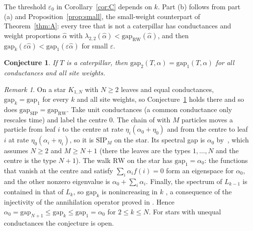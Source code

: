 \documentclass[11pt]{article}
\newtheorem{conjecture}[theorem]{Conjecture}
\theoremstyle{remark}
\newtheorem{remark}[theorem]{Remark}
\newcommand{\gap}{\mathrm{gap}}
\newcommand{\RW}{\mathrm{RW}}
\newcommand{\eps}{\varepsilon}
\begin{document}
The threshold $\eps_0$ in Corollary~\ref{cor:C} depends on $k$. Part (b) follows from part (a) and Proposition~\ref{prop:small}, the small-weight counterpart of Theorem~\ref{thm:A}: every tree that is not a caterpillar has conductances and weight proportions $\hat\alpha$ with $\lambda_{2,2}(\hat\alpha)<\gap_{\RW}(\hat\alpha)$, and then $\gap_k(\eps\hat\alpha)<\gap_1(\eps\hat\alpha)$ for small $\eps$.

\begin{conjecture}\label{conj}
If $T$ is a caterpillar, then $\gap_2(T,\alpha)=\gap_1(T,\alpha)$ for all conductances and all site weights.
\end{conjecture}

\begin{remark}\label{rem:star}
On a star $K_{1,N}$ with $N\ge2$ leaves and equal conductances, $\gap_k=\gap_1$ for every $k$ and all site weights, so Conjecture~\ref{conj} holds there and so does $\gap_{\mathrm{SIP}}=\gap_{\RW}$. Take unit conductances (a common conductance only rescales time) and label the centre $0$. The chain of \cite[Section~5]{FMW15} with $M$ particles moves a particle from leaf $i$ to the centre at rate $\eta_i(\alpha_0+\eta_0)$ and from the centre to leaf $i$ at rate $\eta_0(\alpha_i+\eta_i)$, so it is $\mathrm{SIP}_M$ on the star. Its spectral gap is $\alpha_0$ by~\cite[Theorem~5.1]{FMW15}, which assumes $N\ge2$ and $M\ge N+1$ (there the leaves are the types $1,\dots,N$ and the centre is the type $N+1$). The walk $\RW$ on the star has $\gap_1=\alpha_0$: the functions that vanish at the centre and satisfy $\sum_i\alpha_if(i)=0$ form an eigenspace for $\alpha_0$, and the other nonzero eigenvalue is $\alpha_0+\sum_i\alpha_i$. Finally, the spectrum of $L_{k-1}$ is contained in that of $L_k$, so $\gap_k$ is nonincreasing in $k$ \cite[Section~3.1]{KS25}, a consequence of the injectivity of the annihilation operator proved in \cite[Appendix~A]{KS24}. Hence $\alpha_0=\gap_{N+1}\le\gap_k\le\gap_1=\alpha_0$ for $2\le k\le N$. For stars with unequal conductances the conjecture is open.
\end{remark}
\end{document}
